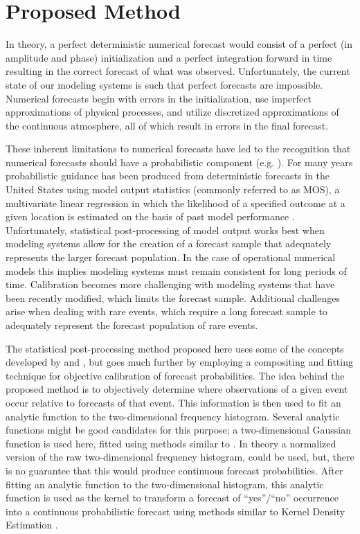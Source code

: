 

\chapter{Proposed Method}
\label{method}

In theory, a perfect deterministic numerical forecast would consist of a perfect (in amplitude and phase) initialization and a perfect integration forward in time resulting in the correct forecast of what was observed.
Unfortunately, the current state of our modeling systems is such that perfect forecasts are impossible.
Numerical forecasts begin with errors in the initialization, use imperfect approximations of physical processes, and utilize discretized approximations of the continuous atmosphere, all of which result in errors in the final forecast.


These inherent limitations to numerical forecasts have led to the recognition that numerical forecasts should have a probabilistic component (e.g. \citealp{Glahn1972, Leith1974, Murphy1993, Glahn2009}).
For many years probabilistic guidance has been produced from deterministic forecasts in the United States using model output statistics (commonly referred to as MOS), a multivariate linear regression in which the likelihood of a specified outcome at a given location is estimated on the basis of past model performance \citep{Glahn1972}.
Unfortunately, statistical post-processing of model output works best when modeling systems allow for the creation of a forecast sample that adequately represents the larger forecast population.
In the case of operational numerical models this implies modeling systems must remain consistent for long periods of time.
Calibration becomes more challenging with modeling systems that have been recently modified, which limits the forecast sample.
Additional challenges arise when dealing with rare events, which require a long forecast sample to adequately represent the forecast population of rare events.


The statistical post-processing method proposed here uses some of the concepts developed by \cite{Theis2005} and \cite{Sobash2011}, but goes much further by employing a compositing and fitting technique for objective calibration of forecast probabilities.
The idea behind the proposed method is to objectively determine where observations of a given event occur relative to forecasts of that event.
This information is then used to fit an analytic function to the two-dimensional frequency histogram.
Several analytic functions might be good candidates for this purpose; a two-dimensional Gaussian function is used here, fitted using methods similar to \cite{Lak2010}.
In theory a normalized version of the raw two-dimensional frequency histogram, could be used, but, there is no guarantee that this would produce continuous forecast probabilities.
After fitting an analytic function to the two-dimensional histogram, this analytic function is used as the kernel to transform a forecast of ``yes''/``no'' occurrence into a continuous probabilistic forecast using methods similar to Kernel Density Estimation \citep{Silverman1986}.




